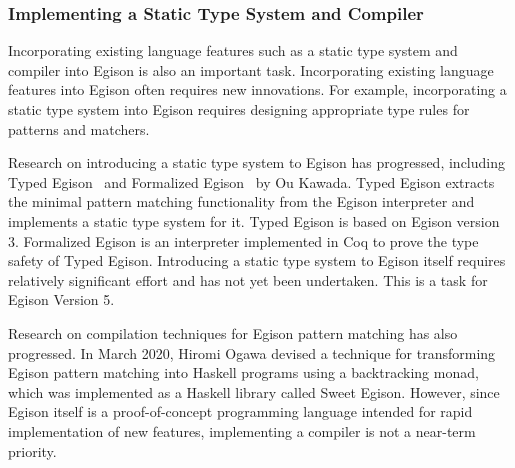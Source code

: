 \subsubsection{Implementing a Static Type System and Compiler}\label{direction-language-egison-existing}

Incorporating existing language features such as a static type system and compiler into Egison is also an important task.
Incorporating existing language features into Egison often requires new innovations.
For example, incorporating a static type system into Egison requires designing appropriate type rules for patterns and matchers.

Research on introducing a static type system to Egison has progressed, including Typed Egison~\cite{typedEgison} and Formalized Egison~\cite{formalizedEgison} by Ou Kawada.
Typed Egison extracts the minimal pattern matching functionality from the Egison interpreter and implements a static type system for it.
Typed Egison is based on Egison version 3.
Formalized Egison is an interpreter implemented in Coq to prove the type safety of Typed Egison.
Introducing a static type system to Egison itself requires relatively significant effort and has not yet been undertaken.
This is a task for Egison Version 5.

Research on compilation techniques for Egison pattern matching has also progressed.
In March 2020, Hiromi Ogawa devised a technique for transforming Egison pattern matching into Haskell programs using a backtracking monad, which was implemented as a Haskell library called Sweet Egison\cite{sweetEgison}.
However, since Egison itself is a proof-of-concept programming language intended for rapid implementation of new features, implementing a compiler is not a near-term priority.

